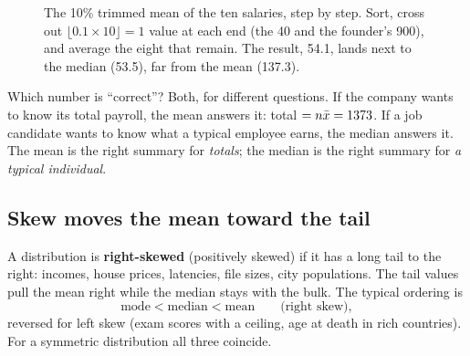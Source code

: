 \begin{figure}[H]
\centering
{}
\caption{The 10\% trimmed mean of the ten salaries, step by step. Sort, cross out
$\lfloor 0.1\times 10\rfloor = 1$ value at each end (the 40 and the founder's 900),
and average the eight that remain. The result, 54.1, lands next to the median (53.5),
far from the mean (137.3).}
\label{fig:center-spread-trimmed}
\end{figure}

Which number is ``correct''? Both, for different questions. If the company wants
to know its total payroll, the mean answers it: total $= n\bar{x} = 1373$. If a job
candidate wants to know what a typical employee earns, the median answers it. The
mean is the right summary for \emph{totals}; the median is the right summary for
\emph{a typical individual}.

\subsection{Skew moves the mean toward the tail}

A distribution is \textbf{right-skewed} (positively skewed) if it has a long tail to
the right: incomes, house prices, latencies, file sizes, city populations. The tail
values pull the mean right while the median stays with the bulk. The typical
ordering is
\[
  \text{mode} < \text{median} < \text{mean} \qquad\text{(right skew)},
\]
reversed for left skew (exam scores with a ceiling, age at death in rich countries).
For a symmetric distribution all three coincide.

